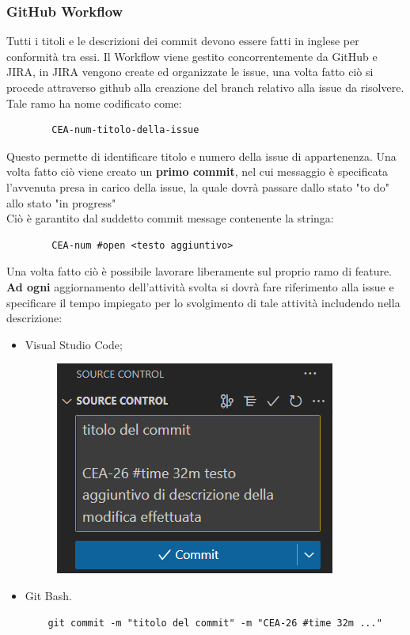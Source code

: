 	\subsubsection{GitHub Workflow}
	Tutti i titoli e le descrizioni dei commit devono essere fatti in inglese per conformità tra essi.
	\newline Il Workflow viene gestito concorrentemente da GitHub e JIRA, in JIRA vengono create ed organizzate le issue, una volta fatto ciò si procede attraverso github alla creazione del branch relativo alla issue da risolvere.\\
	Tale ramo ha nome codificato come:
	\begin{lstlisting}
		CEA-num-titolo-della-issue
	\end{lstlisting}
	Questo permette di identificare titolo e numero della issue di appartenenza. Una volta fatto ciò viene creato un \textbf{primo commit}, nel cui messaggio è specificata l'avvenuta presa in carico della issue, la quale dovrà passare dallo stato "to do" allo stato "in progress"\\
	Ciò è garantito dal suddetto commit message contenente la stringa:
	\begin{lstlisting}
		CEA-num #open <testo aggiuntivo>
	\end{lstlisting}
	Una volta fatto ciò è possibile lavorare liberamente sul proprio ramo di feature.
	\newline \textbf{Ad ogni} aggiornamento dell'attività svolta si dovrà fare riferimento alla issue e specificare il tempo impiegato per lo svolgimento di tale attività includendo nella descrizione:
	\begin{itemize}
		\item Visual Studio Code;
		\begin{figure}[ht!]
			\centering
			\includegraphics[scale=0.7]{img/visual_code_example.png}
		\end{figure}
		\item Git Bash.
		\begin{lstlisting}
	git commit -m "titolo del commit" -m "CEA-26 #time 32m ..."
		\end{lstlisting}
	\end{itemize}
